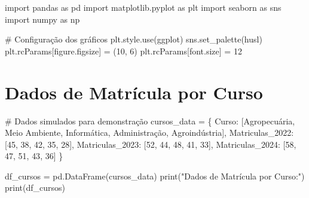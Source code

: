 \documentclass[
  12pt,
  letterpaper,
]{report}
\newenvironment{Shaded}{\begin{snugshade}}{\end{snugshade}}
\newcommand{\BuiltInTok}[1]{\textcolor[rgb]{0.00,0.23,0.31}{#1}}
\newcommand{\CommentTok}[1]{\textcolor[rgb]{0.37,0.37,0.37}{#1}}
\newcommand{\DecValTok}[1]{\textcolor[rgb]{0.68,0.00,0.00}{#1}}
\newcommand{\ImportTok}[1]{\textcolor[rgb]{0.00,0.46,0.62}{#1}}
\newcommand{\NormalTok}[1]{\textcolor[rgb]{0.00,0.23,0.31}{#1}}
\newcommand{\OperatorTok}[1]{\textcolor[rgb]{0.37,0.37,0.37}{#1}}
\newcommand{\StringTok}[1]{\textcolor[rgb]{0.13,0.47,0.30}{#1}}
\begin{document}
\begin{Shaded}
\begin{Highlighting}[]
\ImportTok{import}\NormalTok{ pandas }\ImportTok{as}\NormalTok{ pd}
\ImportTok{import}\NormalTok{ matplotlib.pyplot }\ImportTok{as}\NormalTok{ plt}
\ImportTok{import}\NormalTok{ seaborn }\ImportTok{as}\NormalTok{ sns}
\ImportTok{import}\NormalTok{ numpy }\ImportTok{as}\NormalTok{ np}

\CommentTok{\# Configuração dos gráficos}
\NormalTok{plt.style.use(}\StringTok{\textquotesingle{}ggplot\textquotesingle{}}\NormalTok{)}
\NormalTok{sns.set\_palette(}\StringTok{\textquotesingle{}husl\textquotesingle{}}\NormalTok{)}
\NormalTok{plt.rcParams[}\StringTok{\textquotesingle{}figure.figsize\textquotesingle{}}\NormalTok{] }\OperatorTok{=}\NormalTok{ (}\DecValTok{10}\NormalTok{, }\DecValTok{6}\NormalTok{)}
\NormalTok{plt.rcParams[}\StringTok{\textquotesingle{}font.size\textquotesingle{}}\NormalTok{] }\OperatorTok{=} \DecValTok{12}
\end{Highlighting}
\end{Shaded}

\section{Dados de Matrícula por
Curso}\label{dados-de-matruxedcula-por-curso}

\begin{Shaded}
\begin{Highlighting}[]
\CommentTok{\# Dados simulados para demonstração}
\NormalTok{cursos\_data }\OperatorTok{=}\NormalTok{ \{}
    \StringTok{\textquotesingle{}Curso\textquotesingle{}}\NormalTok{: [}\StringTok{\textquotesingle{}Agropecuária\textquotesingle{}}\NormalTok{, }\StringTok{\textquotesingle{}Meio Ambiente\textquotesingle{}}\NormalTok{, }\StringTok{\textquotesingle{}Informática\textquotesingle{}}\NormalTok{, }\StringTok{\textquotesingle{}Administração\textquotesingle{}}\NormalTok{, }\StringTok{\textquotesingle{}Agroindústria\textquotesingle{}}\NormalTok{],}
    \StringTok{\textquotesingle{}Matriculas\_2022\textquotesingle{}}\NormalTok{: [}\DecValTok{45}\NormalTok{, }\DecValTok{38}\NormalTok{, }\DecValTok{42}\NormalTok{, }\DecValTok{35}\NormalTok{, }\DecValTok{28}\NormalTok{],}
    \StringTok{\textquotesingle{}Matriculas\_2023\textquotesingle{}}\NormalTok{: [}\DecValTok{52}\NormalTok{, }\DecValTok{44}\NormalTok{, }\DecValTok{48}\NormalTok{, }\DecValTok{41}\NormalTok{, }\DecValTok{33}\NormalTok{],}
    \StringTok{\textquotesingle{}Matriculas\_2024\textquotesingle{}}\NormalTok{: [}\DecValTok{58}\NormalTok{, }\DecValTok{47}\NormalTok{, }\DecValTok{51}\NormalTok{, }\DecValTok{43}\NormalTok{, }\DecValTok{36}\NormalTok{]}
\NormalTok{\}}

\NormalTok{df\_cursos }\OperatorTok{=}\NormalTok{ pd.DataFrame(cursos\_data)}
\BuiltInTok{print}\NormalTok{(}\StringTok{"Dados de Matrícula por Curso:"}\NormalTok{)}
\BuiltInTok{print}\NormalTok{(df\_cursos)}
\end{Highlighting}
\end{Shaded}
\end{document}
